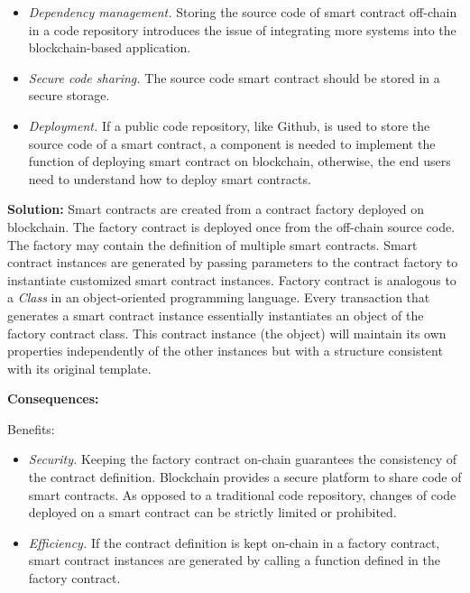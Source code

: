 \begin{itemize}
  \item \textit{Dependency management.} Storing the source code of smart contract off-chain in a code repository introduces the issue of integrating more systems into the blockchain-based application.
  \item \textit{Secure code sharing.} The source code smart contract should be stored in a secure storage. %
  \item \textit{Deployment.} If a public code repository, like Github, is used to store the source code of a smart contract, a component is needed to implement the function of deploying smart contract on blockchain, otherwise, the end users need to understand how to deploy smart contracts.%
\end{itemize}


\vspace{0.5em}\noindent \textbf{Solution:} 
Smart contracts are created from a contract factory deployed on blockchain. The factory contract is deployed once from the off-chain source code. The factory may contain the definition of multiple smart contracts. Smart contract instances are generated by passing parameters to the contract factory to instantiate customized smart contract instances. Factory contract is analogous to a \textit{Class} in an object-oriented programming language. %
Every transaction that generates a smart contract instance essentially instantiates an object of the factory contract class. This contract instance (the object) will maintain its own properties independently of the other instances but with a structure consistent with its original template. 

\vspace{0.5em}\noindent \textbf{Consequences:} 

Benefits:
\begin{itemize}
  \item \textit{Security.} Keeping the factory contract on-chain guarantees the consistency of the contract definition. Blockchain provides a secure platform to share code of smart contracts. As opposed to a traditional code repository, changes of code deployed on a smart contract can be strictly limited or prohibited.
  \item \textit{Efficiency.} If the contract definition is kept on-chain in a factory contract, smart contract instances are generated by calling a function defined in the factory contract. 
\end{itemize}

